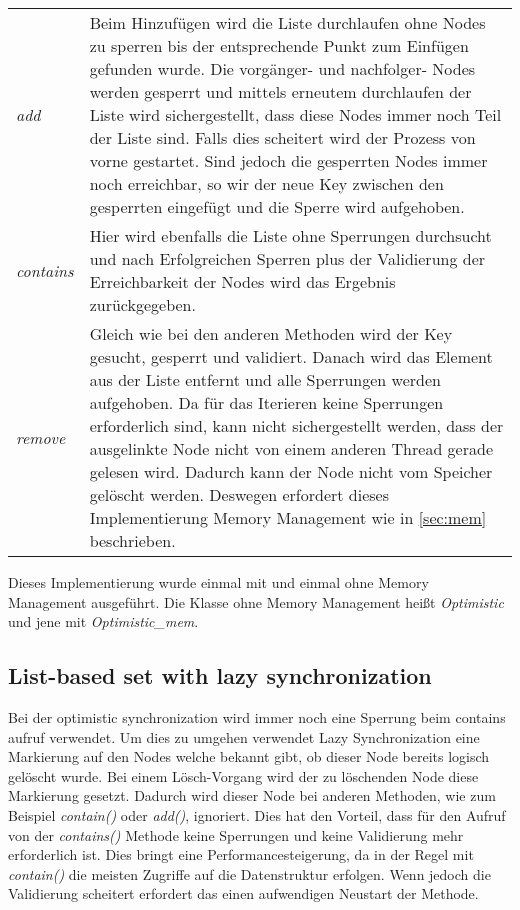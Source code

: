 \begin{table}[H]
    \begin{tabularx}{\textwidth}{lX}
		\textit{add} & Beim Hinzufügen wird die Liste durchlaufen ohne Nodes zu sperren bis der entsprechende Punkt zum Einfügen gefunden wurde. 
		Die vorgänger- und nachfolger- Nodes werden gesperrt und mittels erneutem durchlaufen der Liste wird sichergestellt, dass diese Nodes immer noch Teil der 
		Liste sind. Falls dies scheitert wird der Prozess von vorne gestartet. Sind jedoch die gesperrten Nodes immer noch erreichbar, so wir der neue Key 
		zwischen den gesperrten eingefügt und die Sperre wird aufgehoben.\\
		\textit{contains} & Hier wird ebenfalls die Liste ohne Sperrungen durchsucht und nach Erfolgreichen Sperren plus der Validierung der Erreichbarkeit 
		der Nodes wird das Ergebnis zurückgegeben.\\
		\textit{remove} & Gleich wie bei den anderen Methoden wird der Key gesucht, gesperrt und validiert. Danach wird das Element aus der Liste entfernt und 
		alle Sperrungen werden aufgehoben. Da für das Iterieren keine Sperrungen erforderlich sind, kann nicht sichergestellt werden, dass der ausgelinkte
		Node nicht von einem anderen Thread gerade gelesen wird. Dadurch kann der Node nicht vom Speicher gelöscht werden. Deswegen erfordert dieses Implementierung Memory Management wie in \ref{sec:mem} beschrieben. \\
    \end{tabularx}
\end{table}

Dieses Implementierung wurde einmal mit und einmal ohne Memory Management ausgeführt. Die Klasse ohne Memory Management heißt \textit{Optimistic} und jene mit \textit{Optimistic\_mem}.

\subsection{List-based set with lazy synchronization}

Bei der optimistic synchronization wird immer noch eine Sperrung beim contains aufruf verwendet. 
Um dies zu umgehen verwendet Lazy Synchronization eine Markierung auf den Nodes welche bekannt gibt, ob dieser Node bereits logisch gelöscht wurde. 
Bei einem Lösch-Vorgang wird der zu löschenden Node diese Markierung gesetzt. Dadurch wird dieser Node bei anderen Methoden, 
wie zum Beispiel \textit{contain()} oder \textit{add()}, ignoriert. Dies hat den Vorteil, 
dass für den Aufruf von der \textit{contains()} Methode keine Sperrungen und keine Validierung mehr erforderlich ist.
Dies bringt eine Performancesteigerung, da in der Regel mit \textit{contain()} die meisten Zugriffe auf die Datenstruktur erfolgen.
Wenn jedoch die Validierung scheitert erfordert das einen aufwendigen Neustart der Methode. 


